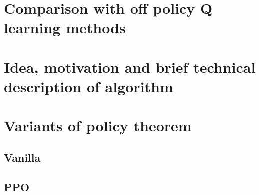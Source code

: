 \section{Comparison with off policy Q learning methods}

\section{Idea, motivation and brief technical description of algorithm}

\section{Variants of policy theorem}
\subsection*{Vanilla}
\subsection*{PPO}

